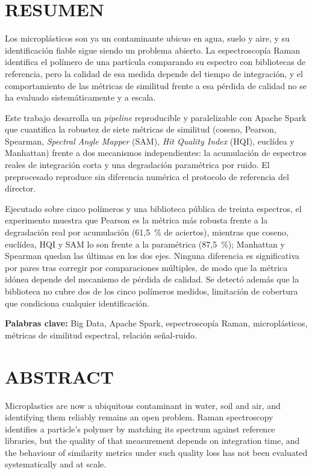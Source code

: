 \chapter*{RESUMEN} \label{chp:abstract}

Los microplásticos son ya un contaminante ubicuo en agua, suelo y aire, y su identificación fiable sigue siendo un problema abierto. La espectroscopía Raman identifica el polímero de una partícula comparando su espectro con bibliotecas de referencia, pero la calidad de esa medida depende del tiempo de integración, y el comportamiento de las métricas de similitud frente a esa pérdida de calidad no se ha evaluado sistemáticamente y a escala.

Este trabajo desarrolla un \textit{pipeline} reproducible y paralelizable con Apache Spark que cuantifica la robustez de siete métricas de similitud (coseno, Pearson, Spearman, \textit{Spectral Angle Mapper} (SAM), \textit{Hit Quality Index} (HQI), euclídea y Manhattan) frente a dos mecanismos independientes: la acumulación de espectros reales de integración corta y una degradación paramétrica por ruido. El preprocesado reproduce sin diferencia numérica el protocolo de referencia del director.

Ejecutado sobre cinco polímeros y una biblioteca pública de treinta espectros, el experimento muestra que Pearson es la métrica más robusta frente a la degradación real por acumulación (61,5~\% de aciertos), mientras que coseno, euclídea, HQI y SAM lo son frente a la paramétrica (87,5~\%); Manhattan y Spearman quedan las últimas en los dos ejes. Ninguna diferencia es significativa por pares tras corregir por comparaciones múltiples, de modo que la métrica idónea depende del mecanismo de pérdida de calidad. Se detectó además que la biblioteca no cubre dos de los cinco polímeros medidos, limitación de cobertura que condiciona cualquier identificación.

\textbf{Palabras clave:} Big Data, Apache Spark, espectroscopía Raman, microplásticos, métricas de similitud espectral, relación señal-ruido.

\chapter*{ABSTRACT}

Microplastics are now a ubiquitous contaminant in water, soil and air, and identifying them reliably remains an open problem. Raman spectroscopy identifies a particle's polymer by matching its spectrum against reference libraries, but the quality of that measurement depends on integration time, and the behaviour of similarity metrics under such quality loss has not been evaluated systematically and at scale.

